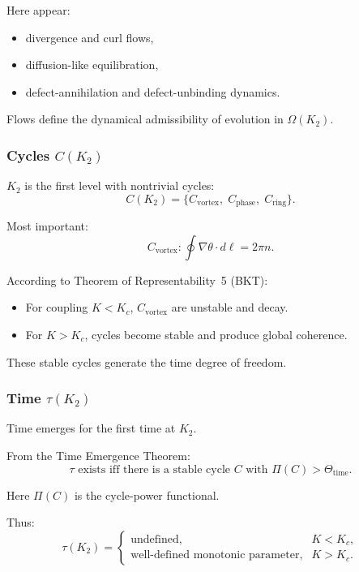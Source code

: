 Here appear:
\begin{itemize}
    \item divergence and curl flows,
    \item diffusion-like equilibration,
    \item defect-annihilation and defect-unbinding dynamics.
\end{itemize}

Flows define the dynamical admissibility of evolution in $\Omega(K_2)$.

\subsubsection{Cycles \texorpdfstring{$C(K_2)$}{C(K_2)}}

$K_2$ is the first level with nontrivial cycles:
\[
C(K_2) = \{C_{\mathrm{vortex}},\; C_{\mathrm{phase}},\; C_{\mathrm{ring}}\}.
\]

Most important:
\[
C_{\mathrm{vortex}}: \oint \nabla \theta \cdot d\ell = 2\pi n.
\]

According to Theorem of Representability~5 (BKT):
\begin{itemize}
    \item For coupling $K < K_c$, $C_{\mathrm{vortex}}$ are unstable and
          decay.
    \item For $K > K_c$, cycles become stable and produce global
          coherence.
\end{itemize}

These stable cycles generate the time degree of freedom.

\subsubsection{Time \texorpdfstring{$\tau(K_2)$}{\tau(K_2)}}

Time emerges for the first time at $K_2$.

From the Time Emergence Theorem:
\[
\tau \text{ exists iff there is a stable cycle }
C \text{ with } \Pi(C) > \Theta_{\mathrm{time}}.
\]

Here $\Pi(C)$ is the cycle-power functional.

Thus:
\[
\tau(K_2) =
\begin{cases}
\text{undefined}, & K < K_c, \\
\text{well-defined monotonic parameter}, & K > K_c.
\end{cases}
\]

